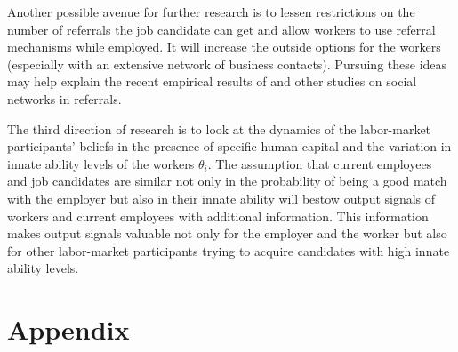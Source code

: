 \documentclass[12pt]{article}
\begin{document}
Another possible avenue for further research is to lessen restrictions on the number of referrals the job candidate can get and allow workers to use referral mechanisms while employed. It will increase the outside options for the workers (especially with an extensive network of business contacts). Pursuing these ideas may help explain the recent empirical results of \cite{lester2021heterogeneous} and other studies on social networks in referrals.

The third direction of research is to look at the dynamics of the labor-market participants' beliefs in the presence of specific human capital and the variation in innate ability levels of the workers $\theta_i$. The assumption that current employees and job candidates are similar not only in the probability of being a good match with the employer but also in their innate ability will bestow output signals of workers and current employees with additional information. This information makes output signals valuable not only for the employer and the worker but also for other labor-market participants trying to acquire candidates with high innate ability levels.

\singlespacing
\setlength\bibsep{0pt}





\clearpage

\onehalfspacing










\clearpage

\section*{Appendix} \label{sec:appendixa}
\end{document}
